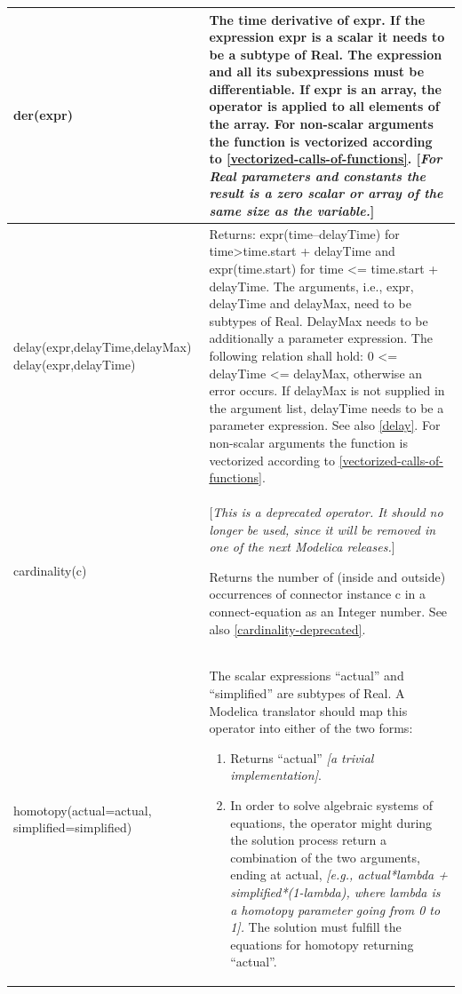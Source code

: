 \documentclass[10pt,a4paper]{report}
\renewcommand{\labelenumi}{\arabic{enumi}.}
\begin{document}
\begin{longtable}{|p{5cm}|p{8cm}|} \hline
der(expr) & The time derivative of expr. If the expression expr is a
scalar it needs to be a subtype of Real. The expression and all its
subexpressions must be differentiable. If expr is an array, the operator
is applied to all elements of the array. For non-scalar arguments the
function is vectorized according to \ref{vectorized-calls-of-functions}. {[}\emph{For Real
parameters and constants the result is a zero scalar or array of the
same size as the variable.}{]}\\ \hline
delay(expr,delayTime,delayMax)
delay(expr,delayTime) & 
Returns: expr(time--delayTime) for~ time\textgreater{}time.start +
delayTime and expr(time.start) for time \textless{}= time.start +
delayTime. The arguments, i.e., expr, delayTime and delayMax, need to be
subtypes of Real. DelayMax needs to be additionally a parameter
expression. The following relation shall hold: 0 \textless{}= delayTime
\textless{}= delayMax, otherwise an error occurs. If delayMax is not
supplied in the argument list, delayTime needs to be a parameter
expression. See also \ref{delay}. For non-scalar arguments the
function is vectorized according to \ref{vectorized-calls-of-functions}.\\ \hline
cardinality(c) & {[}\emph{This is a deprecated operator. It should no longer be used,
since it will be removed in one of the next Modelica releases.}{]}

Returns the number of (inside and outside) occurrences of connector
instance c in a connect-equation as an Integer number. See also \ref{cardinality-deprecated}.\\ \hline
homotopy(actual=actual,\newline
simplified=simplified) & The scalar expressions ``actual'' and ``simplified'' are subtypes of
Real. A Modelica translator should map this operator into either of the
two forms:

\begin{enumerate}
\def\labelenumi{\arabic{enumi}.}
\item
  Returns ``actual'' \emph{{[}a trivial implementation{]}}.
\item
  In order to solve algebraic systems of equations, the operator might
  during the solution process return a combination of the two arguments,
  ending at actual, \emph{{[}e.g.,
  actual*lambda + simplified*(1-lambda),
  where lambda is a homotopy parameter going from 0 to 1{]}.}
  The solution must fulfill the equations for homotopy returning
  ``actual''.
\end{enumerate}


\end{longtable}
\end{document}
